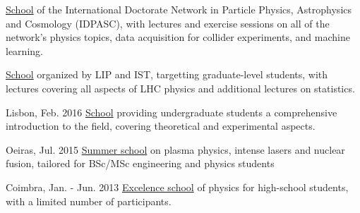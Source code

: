 \begin{cventries}
    
    {\href{https://indico.lip.pt/event/643}{School} of the International Doctorate Network in Particle Physics, Astrophysics and Cosmology (IDPASC), with lectures and exercise sessions on all of the network's physics topics, data acquisition for collider experiments, and machine learning.}\vspace*{2mm}

    {\href{https://indico.cern.ch/event/997566/}{School} organized by LIP and IST, targetting graduate-level students, with lectures covering all aspects of LHC physics and additional lectures on statistics.}

    {}{Lisbon, Feb. 2016}
    {\href{https://indico.lip.pt/event/206/}{School} providing undergraduate students a comprehensive introduction to the field, covering theoretical and experimental aspects.}\vspace*{2mm}

    {}{Oeiras, Jul. 2015}
    {\href{http://plasmasurf.tecnico.ulisboa.pt/index.html}{Summer school} on plasma physics, intense lasers and nuclear fusion, tailored for BSc/MSc engineering and physics students}

    {}{Coimbra, Jan. - Jun. 2013}
    {\href{https://quark.fis.uc.pt}{Excelence school} of physics for high-school students, with a limited number of participants.}

\end{cventries}